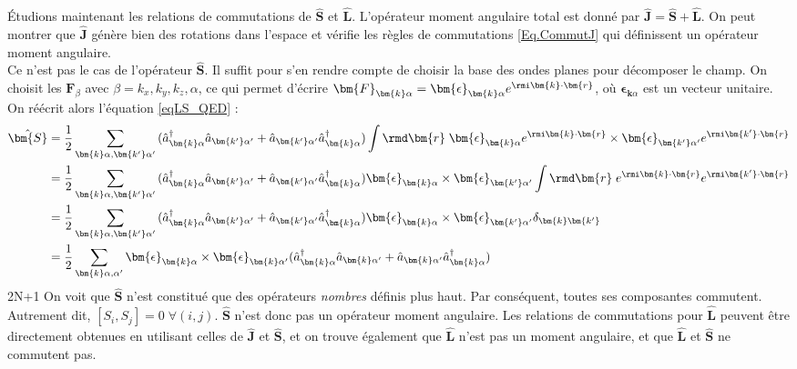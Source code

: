 \'{E}tudions maintenant les relations de commutations de $\hat{\bm{S}}$ et $\hat{\bm{L}}$. L'opérateur moment angulaire total est donné par $\hat{\bm{J}} = \hat{\bm{S}}+\hat{\bm{L}}$. On peut montrer  que $\hat{\bm{J}}$ génère bien des rotations dans l'espace et vérifie les règles de commutations \ref{Eq.CommutJ} qui définissent un opérateur moment angulaire.\\
Ce n'est pas le cas de l'opérateur $\hat{\bm{S}}$. Il suffit pour s'en rendre compte de choisir la base des ondes planes pour décomposer le champ. On choisit les $\bm{F}_{\beta}$ avec $\beta={k_x,k_y,k_z,\alpha}$, ce qui permet d'écrire $\bm{F}_{\bm{k}\alpha}=\bm{\epsilon}_{\bm{k}\alpha}e^{\rmi \bm{k}\cdot\bm{r}}$, où $\bm{\epsilon}_{\bm{k}\alpha}$ est un vecteur unitaire. On réécrit alors l'équation \ref{eqLS_QED} :
\begin{align}
\hat{\bm{S}} &= \frac{1}{2}\sum_{\bm{k}\alpha,\bm{k'}\alpha'}{(\hat{a}^{\dag}_{\bm{k}\alpha}\hat{a}_{\bm{k'}\alpha'}+\hat{a}_{\bm{k'}\alpha'}\hat{a}^{\dag}_{\bm{k}\alpha})}\int{\rmd\bm{r}\;\bm{\epsilon}_{\bm{k}\alpha}e^{\rmi \bm{k}\cdot\bm{r}}\times\bm{\epsilon}_{\bm{k'}\alpha '}e^{\rmi \bm{k'}\cdot\bm{r}}}\\
&= \frac{1}{2}\sum_{\bm{k}\alpha,\bm{k'}\alpha'}{(\hat{a}^{\dag}_{\bm{k}\alpha}\hat{a}_{\bm{k'}\alpha'}+\hat{a}_{\bm{k'}\alpha'}\hat{a}^{\dag}_{\bm{k}\alpha})}\bm{\epsilon}_{\bm{k}\alpha}\times\bm{\epsilon}_{\bm{k'}\alpha '}
\int{\rmd\bm{r}\;e^{\rmi \bm{k}\cdot\bm{r}}e^{\rmi \bm{k'}\cdot\bm{r}}}\\
&= \frac{1}{2}\sum_{\bm{k}\alpha,\bm{k'}\alpha'}{(\hat{a}^{\dag}_{\bm{k}\alpha}\hat{a}_{\bm{k'}\alpha'}+\hat{a}_{\bm{k'}\alpha'}\hat{a}^{\dag}_{\bm{k}\alpha})}\bm{\epsilon}_{\bm{k}\alpha}\times\bm{\epsilon}_{\bm{k'}\alpha '}\delta_{\bm{k}\bm{k'}}\\
&= \frac{1}{2}\sum_{\bm{k}\alpha,\alpha'}{\bm{\epsilon}_{\bm{k}\alpha}\times\bm{\epsilon}_{\bm{k}\alpha '}(\hat{a}^{\dag}_{\bm{k}\alpha}\hat{a}_{\bm{k}\alpha'}+\hat{a}_{\bm{k}\alpha'}\hat{a}^{\dag}_{\bm{k}\alpha})}\\
\label{eqS_planewave}
\end{align}
2N+1
On voit que $\hat{\bm{S}}$ n'est constitué que des opérateurs \textit{nombres} définis plus haut. Par conséquent, toutes ses composantes commutent. Autrement dit, $[S_i,S_j] = 0 \;\forall(i,j)$. $\hat{\bm{S}}$ n'est donc pas un opérateur moment angulaire. Les relations de commutations pour $\hat{\bm{L}}$ peuvent être directement obtenues en utilisant celles de $\hat{\bm{J}}$ et $\hat{\bm{S}}$, et on trouve également que $\hat{\bm{L}}$ n'est pas un moment angulaire, et que $\hat{\bm{L}}$ et $\hat{\bm{S}}$ ne commutent pas. 

